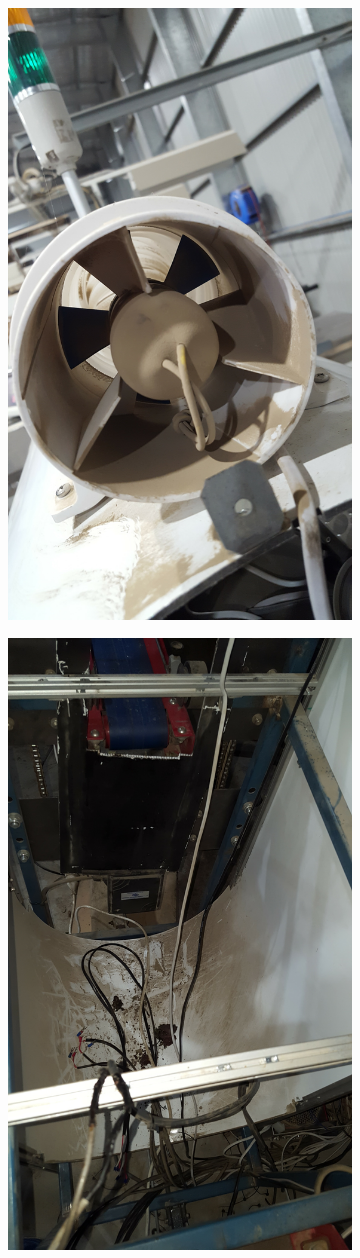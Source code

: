 \documentclass[fleqn,twoside]{article}
\begin{document}
\begin{figure}[ht]
	\centering
	\begin{subfigure}{.25\textwidth}
		\centering
		\includegraphics[height=0.9\linewidth,angle=270]{dirt_1.jpg}
		\caption{}
		\label{fig:dirt_1}
	\end{subfigure}%
	\begin{subfigure}{.25\textwidth}
		\centering
		\includegraphics[height=0.9\linewidth,angle=270]{dirt_2.jpg}

\end{subfigure}
\end{figure}
\end{document}
